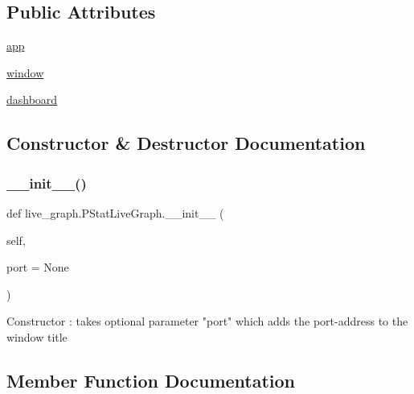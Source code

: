 \subsection*{Public Attributes}
\begin{DoxyCompactItemize}
\item 
\hyperlink{classlive__graph_1_1PStatLiveGraph_ad6b3c5024c9472884e04570fd1890f17}{app}
\item 
\hyperlink{classlive__graph_1_1PStatLiveGraph_a8cc1373f90af09e389d1da5a5b594492}{window}
\item 
\hyperlink{classlive__graph_1_1PStatLiveGraph_aff87cd16c9d35e895cd3d9657fade256}{dashboard}
\end{DoxyCompactItemize}


\subsection{Constructor \& Destructor Documentation}
\mbox{\label{classlive__graph_1_1PStatLiveGraph_a210a499fd4e06392f8f5fffc209971a4}} 
\subsubsection{\texorpdfstring{\+\_\+\+\_\+init\+\_\+\+\_\+()}{\_\_init\_\_()}}
{\footnotesize\ttfamily def live\+\_\+graph.\+P\+Stat\+Live\+Graph.\+\_\+\+\_\+init\+\_\+\+\_\+ (\begin{DoxyParamCaption}\item[{}]{self,  }\item[{}]{port = {\ttfamily None} }\end{DoxyParamCaption})}

\begin{DoxyVerb}Constructor : takes optional parameter "port" which adds the port-address to the window title
\end{DoxyVerb}
 

\subsection{Member Function Documentation}
\mbox{\label{classlive__graph_1_1PStatLiveGraph_abfe72ecd8755e0cc4870ecbd560d45c3}} 
